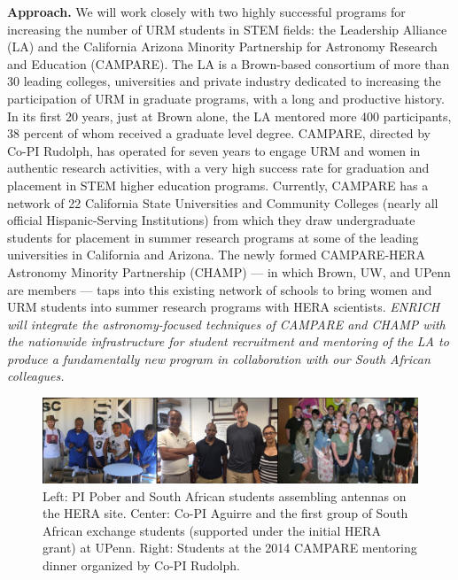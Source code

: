 \documentclass[preprint,11pt]{aastex}
\begin{document}
\textbf{Approach.} We will work closely with two highly successful programs for increasing the number of URM students in STEM fields: the Leadership Alliance (LA) and the California Arizona Minority Partnership for Astronomy Research and Education (CAMPARE).
The LA is a Brown-based consortium of more than 30 leading colleges, universities and private industry dedicated to increasing the participation of URM in graduate programs, with a long and productive history.  
In its first 20 years, just at Brown alone, the LA mentored more 400 participants, 38 percent of whom received a graduate level degree. CAMPARE, directed by Co-PI Rudolph, has operated for seven years to engage URM and women in authentic research activities, with a very high success rate for graduation and placement in STEM higher education programs.  Currently, CAMPARE has a network of 22 California State Universities and Community Colleges (nearly all official Hispanic-Serving Institutions) from which they draw undergraduate students for placement in summer research programs at some of the leading universities in California and Arizona.  The newly formed CAMPARE-HERA Astronomy Minority Partnership (CHAMP) --- in which Brown, UW, and UPenn are members --- 
taps into this existing network of schools to bring women and URM students into summer research programs with HERA scientists.
\emph{ENRICH will integrate the astronomy-focused techniques of CAMPARE and CHAMP with the nationwide infrastructure for student recruitment and mentoring of the LA to produce a fundamentally new program in collaboration with our South African colleagues.} 

\begin{figure}[!ht]
\centering
\includegraphics{education_fig.pdf}
\caption{Left: PI Pober and South African students assembling antennas on the HERA site.  Center: Co-PI Aguirre and the first group of South African exchange students (supported under the initial HERA grant) at UPenn.  Right: Students at the 2014 CAMPARE mentoring dinner organized by Co-PI Rudolph.}
\label{fig:education}
\vspace{-0.2in}
\end{figure}
\end{document}
